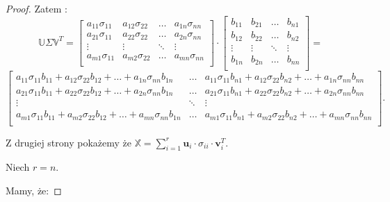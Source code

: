 \documentclass[12pt,a4paper]{report}
\begin{document}
\begin{proof}
Zatem :
$$\mathbb{U} \Sigma \mathbb{V}^T = \left[
        \begin{array}{cccc}
         a_{11} \sigma_{11} & a_{12} \sigma_{22} & \ldots & a_{1n} \sigma_{nn} \\
         a_{21} \sigma_{11} & a_{22} \sigma_{22} & \ldots & a_{2n} \sigma_{nn}\\
         \vdots & \vdots & \ddots & \vdots \\
         a_{m1} \sigma_{11} & a_{m2} \sigma_{22} & \ldots & a_{mn} \sigma_{nn} \\
         \end{array}
      \right] \cdot \left[
        \begin{array}{cccc}
         b_{11} & b_{21} & \ldots & b_{n1}  \\
         b_{12} & b_{22} & \ldots & b_{n2} \\
         \vdots & \vdots & \ddots & \vdots \\
         b_{1n} & b_{2n} & \ldots & b_{nn} \\
         \end{array}
      \right] = 
      $$
      $$\left[
        \begin{array}{ccc}
a_{11} \sigma_{11} b_{11} + a_{12} \sigma_{22} b_{12} + \ldots + a_{1n} \sigma_{nn} b_{1n} & \ldots &  a_{11} \sigma_{11} b_{n1} + a_{12} \sigma_{22} b_{n2} + \ldots + a_{1n} \sigma_{nn} b_{nn} \\
a_{21} \sigma_{11} b_{11} + a_{22} \sigma_{22} b_{12} + \ldots + a_{2n} \sigma_{nn} b_{1n} & \ldots & a_{21} \sigma_{11} b_{n1} + a_{22} \sigma_{22} b_{n2} + \ldots + a_{2n} \sigma_{nn} b_{nn} \\
         \vdots & \ddots & \vdots \\
a_{m1} \sigma_{11} b_{11} + a_{m2} \sigma_{22} b_{12} + \ldots + a_{mn} \sigma_{nn} b_{1n} & \ldots & a_{m1} \sigma_{11} b_{n1} + a_{m2} \sigma_{22} b_{n2} + \ldots + a_{mn} \sigma_{nn} b_{nn} \\
         \end{array}
      \right].$$
      
Z drugiej strony pokażemy że $\mathbb{X} = \sum_{i=1}^r \mathbf{u}_i \cdot\sigma_{ii} \cdot \mathbf{v}_i^T$.

Niech $r=n$.

Mamy, że:


\end{proof}
\end{document}
